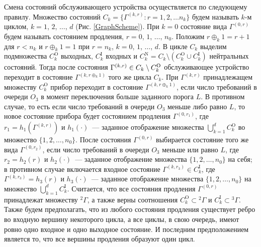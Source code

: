 \documentclass[a4paper,12pt,russian]{extarticle}
\newcommand{\ga}[1]{\Gamma^{\left( #1 \right)} }
\begin{document}
Смена состояний обслуживающего устройства осуществляется по следующему правилу. Множество состояний $C_k = \{\Gamma^{(k,r)} \colon r=1,2,\ldots n_k\}$ будем называть $k$-м циклом, $k=1$, $2$, $\ldots$, $d$ (Рис. \ref{GraphScheme}). При $k=0$ состояние вида $\ga{0,r}$ будем называть состоянием продления, $r=0$, $1$, $\ldots$, $n_0$. Положим $r \oplus_k 1 = r+1$ для $r<n_k$ и $r \oplus_k 1 = 1$ при $r=n_k$, $k = 0$, $1$, $\ldots$, $d$. В цикле $C_k$ выделим подмножества $C_k^{\mathrm{O}}$ выходных, $C_k^{\mathrm{I}}$ входных и $C_k^{\mathrm{N}} = C_k \setminus (C_k^{\mathrm{O}} \cup C_k^{\mathrm{I}})$ нейтральных состояний. Тогда после состояния $\ga{k,r} \hm\in C_k\setminus C_k^{\mathrm{O}}$ обслуживающее устройство переходит в состояние $\ga{k,r \oplus_k 1}$ того же цикла $C_k$. При $\ga{k,r}$ принадлежащем множеству $C_k^{\mathrm{O}}$ прибор переходит в состояние $\ga{k,r\oplus_k 1}$, если число требований в очереди $O_3$ в момент переключения больше заданного порога $L$. В противном случае, то есть если число требований в очереди $O_3$ меньше либо равно $L$, то новое состояние прибора будет состоянием продления $\ga{0,r_1}$, где $r_1=h_1(\ga{k,r})$ и $h_1(\cdot)$~--- заданное отображение множества $\bigcup\limits_{k=1}^d C_k^{\mathrm{O}}$ во множество $\{1,2,\ldots, n_0\}$. После состояния $\ga{0,r}$ выбирается состояние того же вида $\ga{0,r_2}$, если число требований в очереди $O_3$ меньше или равно $L$, где $r_2=h_2(r)$ и $h_2(\cdot)$~--- заданное отображение множества $\{1,2, \ldots, n_0\}$ на себя; в противном случае включается входное состояние $\ga{k,r_3} \in C_k^{\mathrm{I}}$, где $\ga{k,r_3}=h_3(r)$ и $h_3(\cdot)$~--- заданное отображение множества $\{1,2, \ldots, n_0\}$ на множество  $\bigcup\limits_{k=1}^d C_k^{\mathrm{I}}$. Считается, что все состояния продления $\ga{0,r}$ принадлежат множеству ${}^2 \Gamma$, а также верны соотношения $C_k^\mathrm{O}\subset {}^2 \Gamma$ и $C_k^\mathrm{I}\subset {}^3 \Gamma$. Также будем предполагать, что из любого состояния продления существует ребро во входную вершину некоторого цикла, а все циклы, в свою очередь, имеют ровно одно входное и одно выходное состояние. И последним предположением является то, что все вершины продления образуют один цикл.
\end{document}
